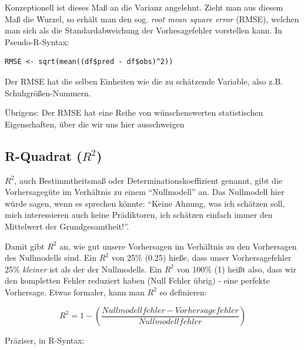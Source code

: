 \documentclass[12pt,]{book}
\makeatletter
\newenvironment{Shaded}{\begin{snugshade}}{\end{snugshade}}
\newcommand{\KeywordTok}[1]{\textcolor[rgb]{0.13,0.29,0.53}{\textbf{{#1}}}}
\newcommand{\DecValTok}[1]{\textcolor[rgb]{0.00,0.00,0.81}{{#1}}}
\newcommand{\StringTok}[1]{\textcolor[rgb]{0.31,0.60,0.02}{{#1}}}
\newcommand{\NormalTok}[1]{{#1}}
\newenvironment{kframe}{%
\medskip{}
\setlength{\fboxsep}{.8em}
 \def\at@end@of@kframe{}%
 \ifinner\ifhmode%
  \def\at@end@of@kframe{\end{minipage}}%
  \begin{minipage}{\columnwidth}%
 \fi\fi%
 \def\FrameCommand##1{\hskip\@totalleftmargin \hskip-\fboxsep
 \colorbox{shadecolor}{##1}\hskip-\fboxsep
     \hskip-\linewidth \hskip-\@totalleftmargin \hskip\columnwidth}%
 \MakeFramed {\advance\hsize-\width
   \@totalleftmargin\z@ \linewidth\hsize
   \@setminipage}}%
 {\par\unskip\endMakeFramed%
 \at@end@of@kframe}
\renewenvironment{Shaded}{\begin{kframe}}{\end{kframe}}
\makeatother
\begin{document}
Konzeptionell ist dieses Maß an die Varianz angelehnt. Zieht man aus
diesem Maß die Wurzel, so erhält man den sog. \emph{root mean square
error} (RMSE), welchen man sich als die Standardabweichung der
Vorhesagefehler vorstellen kann. In Pseudo-R-Syntax:

\begin{verbatim}
RMSE <- sqrt(mean((df$pred - df$obs)^2))
\end{verbatim}

Der RMSE hat die selben Einheiten wie die zu schätzende Variable, also
z.B. Schuhgrößen-Nummern.

Übrigens: Der RMSE hat eine Reihe von wünschenswerten statistischen
Eigenschaften, über die wir uns hier ausschweigen

\subsection{\texorpdfstring{R-Quadrat
(\(R^2\))}{R-Quadrat (R\^{}2)}}\label{r-quadrat-r2}

\(R^2\), auch Bestimmtheitsmaß oder Determinationskoeffizient genannt,
gibt die Vorhersagegüte im Verhältnis zu einem ``Nullmodell'' an. Das
Nullmodell hier würde sagen, wenn es sprechen könnte: ``Keine Ahnung,
was ich schätzen soll, mich interessieren auch keine Prädiktoren, ich
schätzen einfach immer den Mittelwert der Grundgesamtheit!''.

Damit gibt \(R^2\) an, wie gut unsere Vorhersagen im Verhältnis zu den
Vorhersagen des Nullmodells sind. Ein \(R^2\) von 25\% (0.25) hieße,
dass unser Vorhersagefehler 25\% \emph{kleiner} ist als der der
Nullmodells. Ein \(R^2\) von 100\% (1) heißt also, dass wir den
kompletten Fehler reduziert haben (Null Fehler übrig) - eine perfekte
Vorhersage. Etwas formaler, kann man \(R^2\) so definieren:

\[ R^2 = 1 - (\frac{Nullmodellfehler - Vorhersagefehler}{Nullmodellfehler})\]

Präziser, in R-Syntax:

\begin{Shaded}
\end{Shaded}
\end{document}
